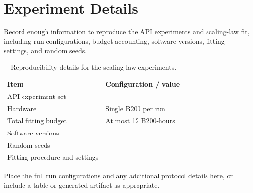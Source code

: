 \section{Experiment Details}
\label{app:experiment-details}

Record enough information to reproduce the API experiments and scaling-law fit, including run configurations, budget accounting, software versions, fitting settings, and random seeds.

\begin{table}[htbp]
\centering\small
\begin{tabular}{@{}ll@{}}
\toprule
Item & Configuration / value \\
\midrule
API experiment set & \\
Hardware & Single B200 per run \\
Total fitting budget & At most 12 B200-hours \\
Software versions & \\
Random seeds & \\
Fitting procedure and settings & \\
\bottomrule
\end{tabular}
\caption{Reproducibility details for the scaling-law experiments.}
\label{tab:experiment-details}
\end{table}

Place the full run configurations and any additional protocol details here, or include a table or generated artifact as appropriate.

